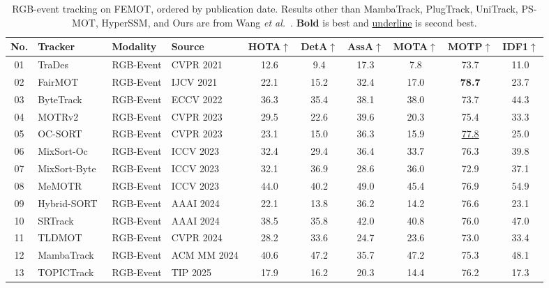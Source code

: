 \documentclass[10pt,twocolumn,letterpaper]{article}
\begin{document}
\begin{table}
  \centering
  \small
  \setlength{\tabcolsep}{3.2pt}
  \caption{RGB-event tracking on FEMOT, ordered by publication date. Results other than MambaTrack, PlugTrack, UniTrack, PS-MOT, HyperSSM, and Ours are from Wang \emph{et al.}~\cite{wang2026femot}. \textbf{Bold} is best and \underline{underline} is second best.}
  \label{tab:femot}
  \begin{tabular}{clllcccccc}
    \toprule
    No. & Tracker & Modality & Source & HOTA$\uparrow$ & DetA$\uparrow$ & AssA$\uparrow$ & MOTA$\uparrow$ & MOTP$\uparrow$ & IDF1$\uparrow$ \\
    \midrule
    01 & TraDes~\cite{wu2021trades} & RGB-Event & CVPR 2021 & 12.6 & 9.4 & 17.3 & 7.8 & 73.7 & 11.0 \\
    02 & FairMOT~\cite{zhang2021fairmot} & RGB-Event & IJCV 2021 & 22.1 & 15.2 & 32.4 & 17.0 & \textbf{78.7} & 23.7 \\
    03 & ByteTrack~\cite{zhang2022bytetrack} & RGB-Event & ECCV 2022 & 36.3 & 35.4 & 38.1 & 38.0 & 73.7 & 44.3 \\
    04 & MOTRv2~\cite{zhang2023motrv2} & RGB-Event & CVPR 2023 & 29.5 & 22.6 & 39.6 & 20.3 & 75.4 & 33.3 \\
    05 & OC-SORT~\cite{cao2023ocsort} & RGB-Event & CVPR 2023 & 23.1 & 15.0 & 36.3 & 15.9 & \underline{77.8} & 25.0 \\
    06 & MixSort-Oc~\cite{cui2023sportsmot} & RGB-Event & ICCV 2023 & 32.4 & 29.4 & 36.4 & 33.7 & 76.3 & 39.8 \\
    07 & MixSort-Byte~\cite{cui2023sportsmot} & RGB-Event & ICCV 2023 & 32.1 & 36.9 & 28.6 & 36.0 & 72.9 & 37.1 \\
    08 & MeMOTR~\cite{gao2023memotr} & RGB-Event & ICCV 2023 & 44.0 & 40.2 & 49.0 & 45.4 & 76.9 & 54.9 \\
    09 & Hybrid-SORT~\cite{yang2024hybridsort} & RGB-Event & AAAI 2024 & 22.1 & 13.8 & 36.2 & 14.2 & 76.6 & 23.1 \\
    10 & SRTrack~\cite{li2024srtrack} & RGB-Event & AAAI 2024 & 38.5 & 35.8 & 42.0 & 40.8 & 76.0 & 47.0 \\
    11 & TLDMOT~\cite{chen2024tldmot} & RGB-Event & CVPR 2024 & 28.2 & 33.6 & 24.7 & 23.6 & 73.0 & 33.4 \\
    12 & MambaTrack~\cite{huang2024mambatrack} & RGB-Event & ACM MM 2024 & 40.6 & 47.2 & 35.7 & 47.2 & 75.3 & 48.1 \\
    13 & TOPICTrack~\cite{cao2025topictrack} & RGB-Event & TIP 2025 & 17.9 & 16.2 & 20.3 & 14.4 & 76.2 & 17.3 \\

\end{tabular}
\end{table}
\end{document}
